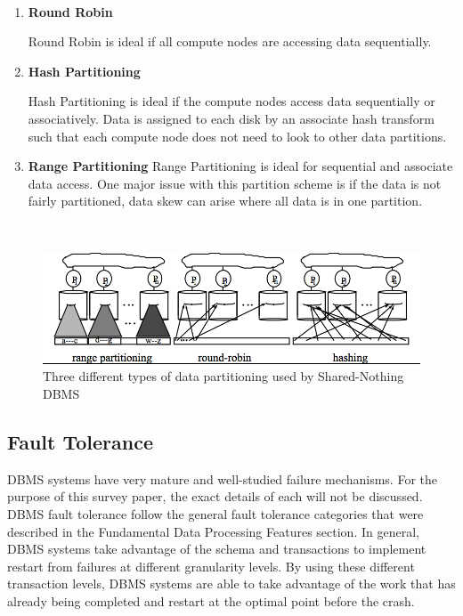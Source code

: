 \documentclass[10pt,twocolumn]{IEEEtran11}
\begin{document}
\  \\
\begin{enumerate}
	\setlength\itemsep{1em}
	\item 
	
	\textbf{Round Robin}
	
	Round Robin is ideal if all compute nodes are accessing data sequentially.
	\item 
		
	\textbf{Hash Partitioning}
	
	Hash Partitioning is ideal if the compute nodes access data sequentially or associatively.  Data is assigned to each disk by an associate hash transform such that each compute node does not need to look to other data partitions.
	
	\item 
	
	\textbf{Range Partitioning}
	Range Partitioning is ideal for sequential and associate data access.  One major issue with this partition scheme is if the data is not fairly partitioned, data skew can arise where all data is in one partition.
	
\end{enumerate}
\  \\

\begin{figure}[h]
	\centering
	\includegraphics[scale=0.25]{images/dbmsDataPartition.png}
	\caption{Three different types of data partitioning used by Shared-Nothing DBMS  \protect\cite{dewitt1992parallel}}
	\label{fig:dbmsDataPartition}
\end{figure}

\subsection{Fault Tolerance}
DBMS systems have very mature and well-studied failure mechanisms.  For the purpose of this survey paper, the exact details of each will not be discussed.  DBMS fault tolerance follow the general fault tolerance categories that were described in the Fundamental Data Processing Features section.  In general, DBMS systems take advantage of the schema and transactions to implement restart from failures at different granularity levels.  By using these different transaction levels, DBMS systems are able to 
take advantage of the work that has already being completed and restart at the optimal point before the crash.
\end{document}
